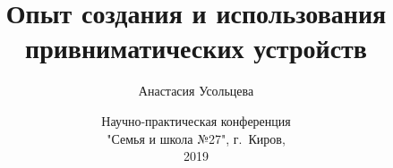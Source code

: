 


\date{Научно-практическая конференция\\"Семья и школа №27", г.~Киров, \\2019}
\author[А.~Усольцева]{Анастасия Усольцева}

\title[Разработка привниматических устройств]{Опыт создания и использования привниматических устройств}

\newcommand{\myDevice}{ТРЕНЬК-2}







